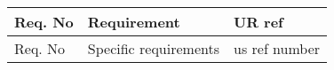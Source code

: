\begin{center}
    \begin{tabular}{ | l |l | p|}
    \hline
    Req. No & Requirement  & UR ref \\ \hline
    Req. No & Specific requirements  & us ref number \\ \hline
    \hline
    \end{tabular}
\end{center}
